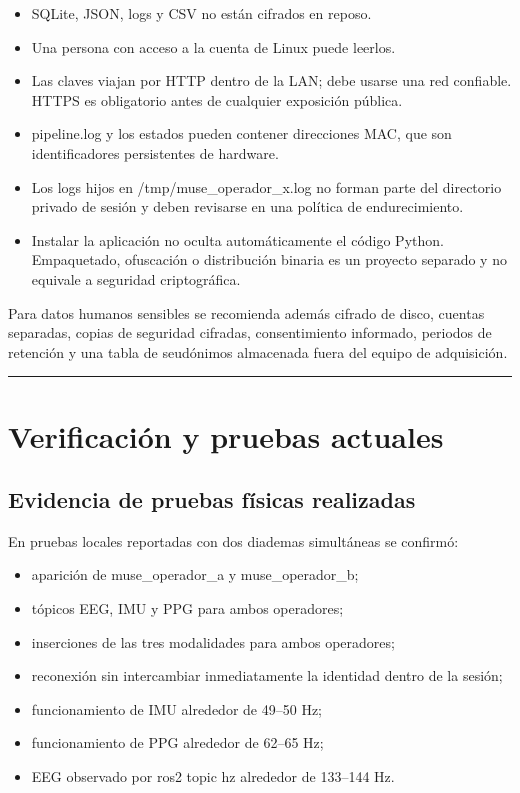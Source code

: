 \documentclass[11pt,a4paper]{article}
\begin{document}
\begin{itemize}
\item SQLite, JSON, logs y CSV no están cifrados en reposo.
\item Una persona con acceso a la cuenta de Linux puede leerlos.
\item Las claves viajan por HTTP dentro de la LAN; debe usarse una red confiable. HTTPS es obligatorio antes de cualquier exposición pública.
\item {\ttfamily\small pipeline.log} y los estados pueden contener direcciones MAC, que son identificadores
persistentes de hardware.

\item Los logs hijos en {\ttfamily\small /tmp/muse\_operador\_x.log} no forman parte del directorio privado de
sesión y deben revisarse en una política de endurecimiento.

\item Instalar la aplicación no oculta automáticamente el código Python. Empaquetado,
ofuscación o distribución binaria es un proyecto separado y no equivale a seguridad criptográfica.

\end{itemize}

Para datos humanos sensibles se recomienda además cifrado de disco, cuentas separadas, copias de seguridad cifradas, consentimiento informado, periodos de retención y una tabla de seudónimos almacenada fuera del equipo de adquisición.

\medskip\hrule\medskip

\section{Verificación y pruebas actuales}

\subsection{Evidencia de pruebas físicas realizadas}

En pruebas locales reportadas con dos diademas simultáneas se confirmó:

\begin{itemize}
\item aparición de {\ttfamily\small muse\_operador\_a} y {\ttfamily\small muse\_operador\_b};
\item tópicos EEG, IMU y PPG para ambos operadores;
\item inserciones de las tres modalidades para ambos operadores;
\item reconexión sin intercambiar inmediatamente la identidad dentro de la sesión;
\item funcionamiento de IMU alrededor de 49–50 Hz;
\item funcionamiento de PPG alrededor de 62–65 Hz;
\item EEG observado por {\ttfamily\small ros2 topic hz} alrededor de 133–144 Hz.
\end{itemize}
\end{document}
